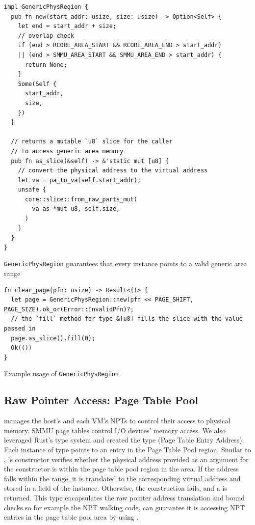 \begin{listing}[hbtp]
    \begin{verbatim}
impl GenericPhysRegion {
  pub fn new(start_addr: usize, size: usize) -> Option<Self> {
    let end = start_addr + size;
    // overlap check
    if (end > RCORE_AREA_START && RCORE_AREA_END > start_addr)
    || (end > SMMU_AREA_START && SMMU_AREA_END > start_addr) {
      return None;
    }
    Some(Self {
      start_addr,
      size,
    })
  }

  // returns a mutable `u8` slice for the caller
  // to access generic area memory
  pub fn as_slice(&self) -> &'static mut [u8] {
    // convert the physical address to the virtual address
    let va = pa_to_va(self.start_addr);
    unsafe {
      core::slice::from_raw_parts_mut(
        va as *mut u8, self.size,
      )
    }
  }
}
    \end{verbatim}
    \caption{\texttt{GenericPhysRegion} guarantees that every instance points to a valid generic area range}
    \label{lst:genericphysslice}
    \vspace{-0.2cm}
\end{listing}

\begin{listing}[hbtp]
    \begin{verbatim}
fn clear_page(pfn: usize) -> Result<()> {
  let page = GenericPhysRegion::new(pfn << PAGE_SHIFT, PAGE_SIZE).ok_or(Error::InvalidPfn)?;
  // the `fill` method for type &[u8] fills the slice with the value passed in
  page.as_slice().fill(0);
  Ok(())
}
    \end{verbatim}
    \caption{Example usage of \texttt{GenericPhysRegion}}
    \label{lst:genericusage}
    \vspace{-0.2cm}
\end{listing}

\subsection{Raw Pointer Access: Page Table Pool}
\rustcore{} manages the host's and each VM's NPTs to control their access to
physical memory. SMMU page tables control I/O devices' memory access.
We also leveraged Rust's type system and created the
type  (Page Table Entry Address). Each instance of type 
points to an entry in the \rustcore{} Page Table Pool region.
Similar to , 's constructor verifies whether the physical address provided as an
argument for the constructor is within the page table pool region in the \rustcore{}
area. If the address falls within the range, it is translated to the
corresponding virtual address and stored in a field of the
 instance. Otherwise, the construction fails, and a
 is returned.
This type encapsulates the raw pointer address translation and bound
checks so for example the NPT walking code,
can guarantee it is accessing NPT entries in the
\rustcore{} page table pool area by using .

